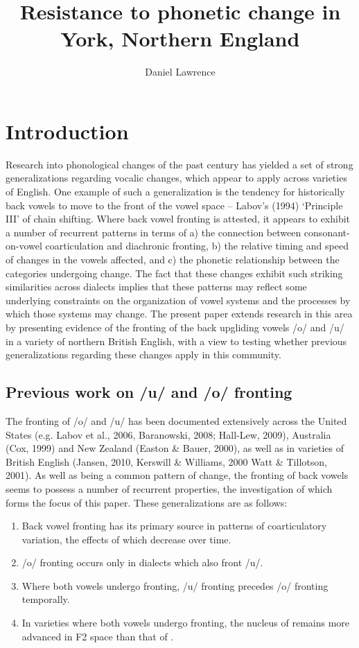 \documentclass[12pt]{article}
\title{Resistance to phonetic change in York, Northern England}
\author{Daniel Lawrence}
\begin{document}
\maketitle

\section{Introduction}

Research into phonological changes of the past century has yielded a set of strong generalizations regarding vocalic changes, which appear to apply across varieties of English. One example of such a generalization is the tendency for historically back vowels to move to the front of the vowel space -- Labov's (1994) `Principle III' of chain shifting. Where back vowel fronting is attested, it appears to exhibit a number of recurrent patterns in terms of a) the connection between consonant-on-vowel coarticulation and diachronic fronting, b) the relative timing and speed of changes in the vowels affected, and c) the phonetic relationship between the categories undergoing change. The fact that these changes exhibit such striking similarities across dialects implies that these patterns may reflect some underlying constraints on the organization of vowel systems and the processes by which those systems may change. The present paper extends research in this area by presenting evidence of the fronting of the back upgliding vowels /o/ and /u/ in a variety of northern British English, with a view to testing whether previous generalizations regarding these changes apply in this community.

\subsection{Previous work on /u/ and /o/ fronting}

The fronting of /o/ and /u/  has been documented extensively across the United States (e.g. Labov et al., 2006, Baranowski, 2008; Hall-Lew, 2009), Australia (Cox, 1999) and New Zealand (Easton \& Bauer, 2000), as well as in varieties of British English (Jansen, 2010, Kerswill \& Williams, 2000 Watt \& Tillotson, 2001). As well as being a common pattern of change, the fronting of back vowels seems to possess a number of recurrent properties, the investigation of which forms the focus of this paper. These generalizations are as follows:

\begin{enumerate}
\item{Back vowel fronting has its primary source in patterns of coarticulatory variation, the effects of which decrease over time.}
\item{/o/ fronting occurs only in dialects which also front /u/.}
\item{Where both vowels undergo fronting, /u/ fronting precedes /o/ fronting temporally.}
\item{In varieties where both vowels undergo fronting, the nucleus of  remains more advanced in F2 space than that of .}
\end{enumerate}
\end{document}
